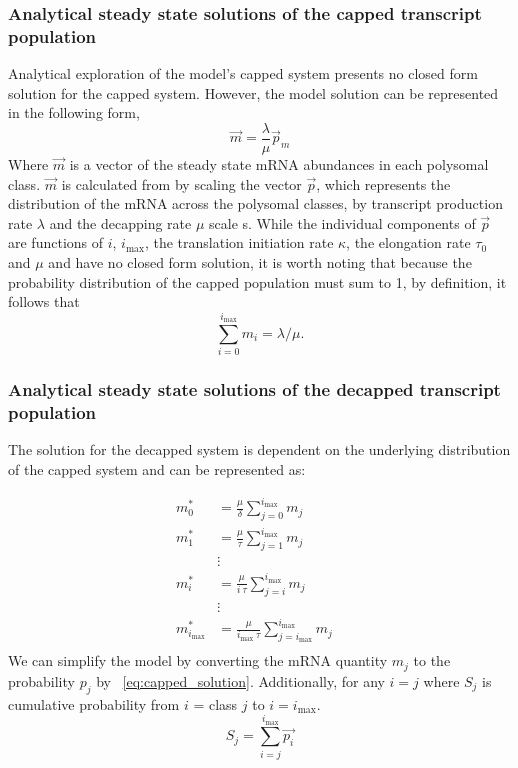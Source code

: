 \documentclass[review]{elsarticle}
\newcommand{\imax}{\ensuremath{{i_{\max}}}\xspace}
\begin{document}
\subsubsection{Analytical steady state solutions of the capped transcript population}
Analytical exploration of the model's capped system presents no closed form solution for the capped system.
However, the model solution can be represented in the following form,
	\begin{equation} \label{eq:capped_solution}
		\vec{m}=\frac{\lambda}{\mu}\vec{p}_m
	\end{equation}
Where $\vec{m}$ is a vector of the steady state mRNA abundances in each polysomal class.
$\vec{m}$ is calculated from by scaling  the vector $\vec{p}$, which represents the distribution of the mRNA across the polysomal classes, by transcript production rate $\lambda$ and the decapping rate $\mu$ scale s.
While the individual components of $\vec{p}$ are functions of $i$, \imax, the translation initiation rate $\kappa$, the elongation rate $\tau_0$ and $\mu$ and have no closed form solution, it is worth noting that because the probability distribution of the capped population must sum to 1, by definition, it follows that
\begin{equation}\label{eq:capped_sum}
\sum_{i = 0} ^\imax m_i = \lambda/\mu.
\end{equation}

\subsubsection{Analytical steady state solutions of the decapped transcript population}

The solution for the decapped system is dependent on the underlying distribution of the capped system and can be represented as:

\begin{align*}
m_{0}^{*}  &= \frac{\mu}{\delta}\sum_{j=0}^{\imax}m_{j} \\
m_{1}^{*}  &= \frac{\mu}{\tau}\sum_{j=1}^{\imax}m_{j}  \\
& \vdots & \\
m_{i}^{*}  &= \frac{\mu}{i \: \tau}\sum_{j=i}^{\imax}m_{j}  \\
& \vdots & \\
m_{\imax}^{*}  &= \frac{\mu}{\imax \: \tau}\sum_{j=\imax}^{\imax}m_{j}  \\
\end{align*}
We can simplify the model by converting the mRNA quantity $m_{j}$ to the probability $p_{j}$ by ~\ref{eq:capped_solution}.
Additionally, for any $i=j$ where $S_{j}$ is cumulative probability from $i$ = class $j$ to $ i= \imax$.
\begin{equation}
		S_{j} = \sum_{i=j}^{\imax}\vec{p_{i}}
\end{equation}
\end{document}

